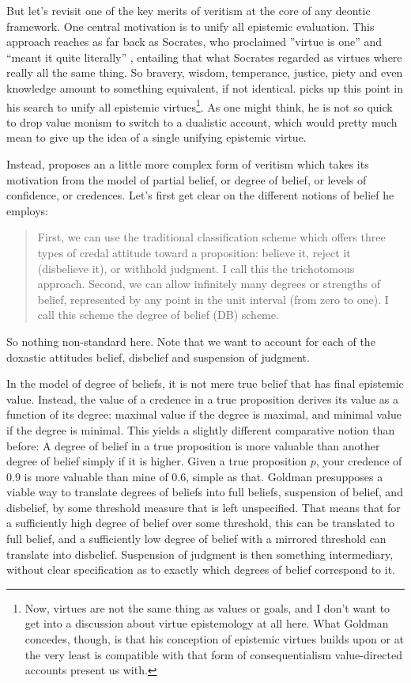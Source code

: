 \documentclass[12pt,numbers=noenddot]{scrartcl}
\begin{document}
But let's revisit one of the key merits of veritism at the core of any deontic framework. One central motivation is to unify all epistemic evaluation. This approach reaches as far back as Socrates, who proclaimed ”virtue is one” and “meant it quite literally” \autocite{penner1973}, entailing that what Socrates regarded as virtues where really all the same thing. So bravery, wisdom, temperance, justice, piety and even knowledge amount to something equivalent, if not identical.
\textcite{Goldman2002-GOLTUO-2} picks up this point in his search to unify all epistemic virtues\footnote{Now, virtues are not the same thing as values or goals, and I don't want to get into a discussion about virtue epistemology at all here. What Goldman concedes, though, is that his conception of epistemic virtues builds upon or at the very least is compatible with that form of consequentialism value-directed accounts present us with.}. As one might think, he is not so quick to drop value monism to switch to a dualistic account, which would pretty much mean to give up the idea of a single unifying epistemic virtue.

Instead, \textcite[58]{Goldman2002-GOLTUO-2} proposes an a little more complex form of veritism which takes its motivation from the model of partial belief, or degree of belief, or levels of confidence, or credences. Let's first get clear on the different notions of belief he employs:

\begin{quote}
    First, we can use the traditional classification scheme which offers three types of credal attitude toward a proposition: believe it, reject it (disbelieve it), or withhold judgment. I call this the trichotomous approach. Second, we can allow infinitely many degrees or strengths of belief, represented by any point in the unit interval (from zero to one). I call this scheme the degree of belief (DB) scheme. \autocite[88]{Goldman1999-GOLKIA}
\end{quote}

So nothing non-standard here. Note that we want to account for each of the doxastic attitudes belief, disbelief and suspension of judgment.

In the model of degree of beliefs, it is not mere true belief that has final epistemic value. Instead, the value of a credence in a true proposition derives its value as a function of its degree: maximal value if the degree is maximal, and minimal value if the degree is minimal. This yields a slightly different comparative notion than before: A degree of belief in a true proposition is more valuable than another degree of belief simply if it is higher. Given a true proposition $p$, your credence of $0.9$ is more valuable than mine of $0.6$, simple as that.
Goldman presupposes a viable way to translate degrees of beliefs into full beliefs, suspension of belief, and disbelief, by some threshold measure that is left unspecified. That means that for a sufficiently high degree of belief over some threshold, this can be translated to full belief, and a sufficiently low degree of belief with a mirrored threshold can translate into disbelief. Suspension of judgment is then something intermediary, without clear specification as to exactly which degrees of belief correspond to it.
\end{document}
